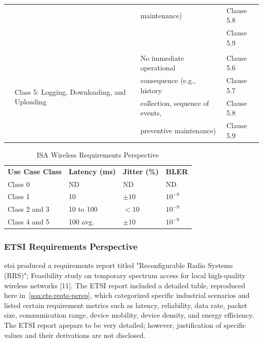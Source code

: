\begin{table}[!tb]
\begin{adjustbox}{width=\columnwidth,center}
\begin{tabular}{|l|l|p{10.645em}|p{10em}|}
		&       & maintenance)  & Clause 5.8  \\
		&       & \multicolumn{1}{l|}{} & Clause 5.9  \\
		&       & \multicolumn{1}{l|}{} & \multicolumn{1}{l|}{} \\
		\cmidrule{2-4}      & \multicolumn{1}{l|}{\multirow{4}[2]{*}{Class 5:  Logging, Downloading, and Uploading}} & No immediate operational  & Clause 5.6  \\
		&       & consequence (e.g., history  & Clause 5.7  \\
		&       & collection, sequence of events,  & Clause 5.8  \\
		&       & preventive maintenance)  & Clause 5.9  \\
		\bottomrule
	\end{tabular}%

	\end{adjustbox}

	\label{soa:isa-classes}%
\end{table}%


\begin{table}[!tb]
	\centering
	\caption{ISA Wireless Requirements Perspective}
	\label{soa:isa-reqts-persp}%

	\begin{tabular}{|p{10.57em}|p{5.855em}|p{5.855em}|p{5.855em}|}
		\toprule
		\textbf{Use Case Class} & \textbf{Latency (ms)} & \textbf{Jitter (\%)} & \textbf{BLER} \\
		Class 0 & ND    & ND    & ND \\
		\midrule
		Class 1 & \multicolumn{1}{l|}{10} & $\pm10$ & $10^{-9}$ \\
		\midrule
		Class 2 and 3 & 10 to 100 & $<10$ & $10^{-9}$ \\
		\midrule
		Class 4 and 5 & 100 avg. & $\pm10$ & $10^{-9}$ \\
		\bottomrule
	\end{tabular}%
\end{table}%


\subsubsection{ETSI Requirements Perspective}\label{sec:litreview:etsi}

\Gls{etsi} produced a requirements report titled "Reconfigurable Radio Systems (RRS)"; Feasibility study on temporary spectrum access for local high-quality wireless networks [11]. The ETSI report included a detailed table, reproduced here in~\ref{soa:ets-reqts-persp}, which categorized specific industrial scenarios and listed certain requirement metrics such as latency, reliability, data rate, packet size, communication range, device mobility, device density, and energy efficiency. The ETSI report apepars to be very detailed; however, justification of specific values and their derivations are not disclosed.

